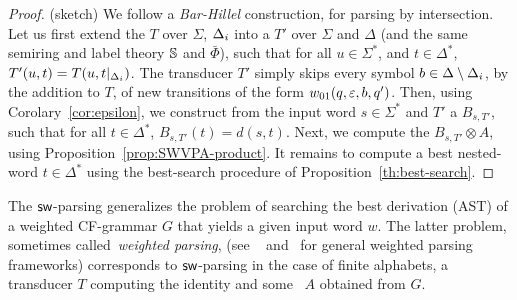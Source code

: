 \begin{proof} (sketch)
We follow a \emph{Bar-Hillel} construction, for parsing by intersection.
%
\noindent
Let us first extend the \SWT $T$ over $\Sigma$, $\Deltai$
into a \SWT $T'$ over $\Sigma$ and $\Delta$
(and the same semiring and label theory $\mathbb{S}$ and $\bar\Phi$),
such that for all $u \in \Sigma^*$, and $t \in {\Delta}^*$,
$T'(u, t) = T(u, t|_{\Deltai})$.
%
The transducer $T'$ simply skips every symbol
$b \in {\Delta} \setminus \Deltai$,
by the addition to $T$,
of new transitions of the form $\wei_{01}(q, \varepsilon, b, q')$.
%
\noindent
Then, using Corolary~\ref{cor:epsilon},
we construct from the input word $s \in \Sigma^*$ and $T'$
a \SWA $B_{s, T'}$,
such that for all $t \in \Delta^*$, $B_{s, T'}(t) = d(s, t)$.
%
%
\noindent
Next, %
we compute the \SWVPA $B_{s, T'} \otimes A$,
using Proposition~\ref{prop:SWVPA-product}.
%
\noindent
It remains to compute a best nested-word $t \in {\Delta}^*$
using the best-search procedure of Proposition~\ref{th:best-search}.
\end{proof}
The $\textsf{sw}$-parsing generalizes
the problem of searching the best derivation (AST) of a weighted CF-grammar $G$
that yields a given input word $w$.
The latter problem, sometimes called~\emph{weighted parsing},
(see \eg~\cite{Goodman99SemiringParsing}
 and~\cite{MorbitzVogler19weighted-parsing} for general weighted parsing frameworks)
corresponds to $\textsf{sw}$-parsing in the case of finite alphabets,
a transducer $T$ computing the identity and some \SWVPA~$A$
obtained from $G$. %
%
